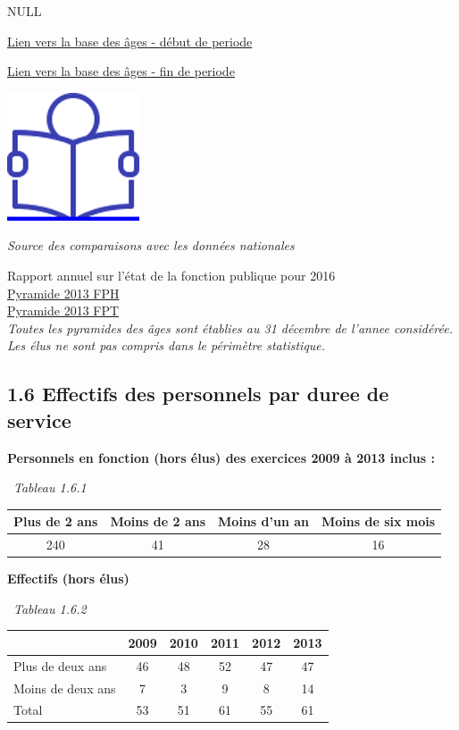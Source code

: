 NULL

\href{../Bases/Effectifs/Pyramide-des-ages-des-autres-personnels_2009.csv}{Lien
vers la base des âges - début de periode}

\href{../Bases/Effectifs/Pyramide-des-ages-des-autres-personnels_2013.csv}{Lien
vers la base des âges - fin de periode}

\href{../Docs/Notices/fiche_1.odt}{\includegraphics{icones/Notice.png}}

\emph{Source des comparaisons avec les données nationales}

Rapport annuel sur l'état de la fonction publique pour 2016\\
\href{../Docs/insee_pyramide_fph_2013.csv}{Pyramide 2013 FPH}\\
\href{../Docs/insee_pyramide_fpt_2013.csv}{Pyramide 2013 FPT}\\
\emph{Toutes les pyramides des âges sont établies au 31 décembre de
l'annee considérée.}\\
\emph{Les élus ne sont pas compris dans le périmètre statistique.}

\hypertarget{effectifs-des-personnels-par-duree-de-service}{%
\subsection{1.6 Effectifs des personnels par duree de
service}\label{effectifs-des-personnels-par-duree-de-service}}

\textbf{Personnels en fonction (hors élus) des exercices 2009 à 2013
inclus :}

~\emph{Tableau 1.6.1}

\begin{longtable}[]{@{}cccc@{}}
\toprule
Plus de 2 ans & Moins de 2 ans & Moins d'un an & Moins de six
mois\tabularnewline
\midrule
\endhead
240 & 41 & 28 & 16\tabularnewline
\bottomrule
\end{longtable}

\textbf{Effectifs (hors élus)}

~\emph{Tableau 1.6.2}

\begin{longtable}[]{@{}lccccc@{}}
\toprule
& 2009 & 2010 & 2011 & 2012 & 2013\tabularnewline
\midrule
\endhead
Plus de deux ans & 46 & 48 & 52 & 47 & 47\tabularnewline
Moins de deux ans & 7 & 3 & 9 & 8 & 14\tabularnewline
Total & 53 & 51 & 61 & 55 & 61\tabularnewline
\bottomrule
\end{longtable}

